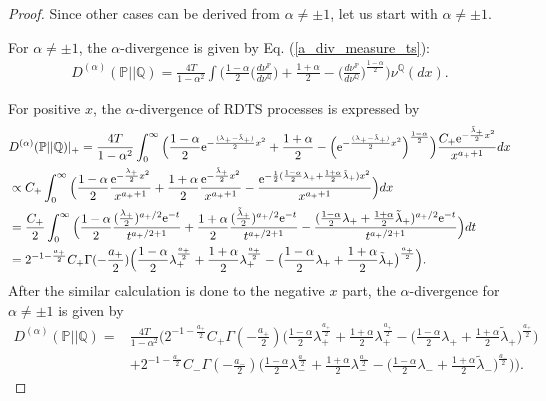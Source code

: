 \documentclass[preprint,11pt]{amsart}
\begin{document}
	\begin{proof}
	Since other cases can be derived from $\alpha \neq \pm 1$, let us start with $\alpha \neq \pm 1$.
	
	For $\alpha \neq \pm 1$, the $\alpha$-divergence is given by Eq. (\ref{a_div_measure_ts}):
	\begin{align}
		D^{(\alpha)}(\mathbb{P}||\mathbb{Q})=\frac{4T}{1-\alpha ^{2}}\int \Big(\frac{1-\alpha}{2}\Big(\frac{d\nu^\mathbb{P}}{d\nu^\mathbb{Q}}\Big) +\frac{1+\alpha}{2}-\Big(\frac{d\nu^\mathbb{P}}{d\nu^\mathbb{Q}}\Big)^{\frac{1-\alpha}{2}}\Big) \nu^\mathbb{Q}(dx).\nonumber
	\end{align}
	
	For positive $x$, the $\alpha$-divergence of RDTS processes is expressed by
	\begin{align}
		&D^{(\alpha)}(\mathbb{P}||\mathbb{Q})|_{+}=\frac{4T}{1-\alpha ^{2}}\int_0^\infty \Big(\frac{1-\alpha}{2}{\rm e}^{-\frac{(\lambda_+-\tilde{\lambda}_+)}{2}x^2} +\frac{1+\alpha}{2}- \Big({\rm e}^{-\frac{(\lambda_+-\tilde{\lambda}_+)}{2}x^2}\Big)^{\frac{1-\alpha}{2}}\Big)\frac{C_+{\rm e}^{-\frac{\tilde{\lambda}_+}{2} x^2}}{x^{a_++1}} dx\nonumber\\
	&\propto C_+\int_0^\infty \Big(\frac{1-\alpha}{2}\frac{{\rm e}^{-\frac{\lambda_+}{2} x^2}}{x^{a_++1}} +\frac{1+\alpha}{2}\frac{{\rm e}^{-\frac{\tilde{\lambda}_+}{2} x^2}}{x^{a_++1}} -\frac{{\rm e}^{-\frac{1}{2}(\frac{1-\alpha}{2}\lambda_++\frac{1+\alpha}{2}\tilde{\lambda}_+) x^2}}{x^{a_++1}} \Big)dx\nonumber\\
	&=\frac{C_+}{2}\int_0^\infty \Big(\frac{1-\alpha}{2}\frac{(\frac{\lambda_+}{2})^{a_+/2}{\rm e}^{-t}}{t^{a_+/2+1}} +\frac{1+\alpha}{2}\frac{(\frac{\tilde{\lambda}_+}{2})^{a_+/2}{\rm e}^{-t}}{t^{a_+/2+1}} -\frac{(\frac{1-\alpha}{2}\lambda_++\frac{1+\alpha}{2}\tilde{\lambda}_+)^{a_+/2}{\rm e}^{-t}}{t^{a_+/2+1}} \Big)dt\nonumber\\
	&=2^{-1-\frac{a_+}{2}}C_+\Gamma(-\frac{a_+}{2})\Big(\frac{1-\alpha}{2}\lambda_+^{\frac{a_+}{2}}+\frac{1+\alpha}{2}\lambda_+^{\frac{a_+}{2}}-\big(\frac{1-\alpha}{2}\lambda_++\frac{1+\alpha}{2}\tilde{\lambda}_+\big)^{\frac{a_+}{2}}\Big).\nonumber
	\end{align}
	After the similar calculation is done to the negative $x$ part, the $\alpha$-divergence for $\alpha \neq \pm 1$ is given by
	\begin{align}
	D^{(\alpha)}(\mathbb{P}||\mathbb{Q})=&\frac{4T}{1-\alpha ^{2}}\bigg(2^{-1-\frac{a_+}{2}}C_+\Gamma(-\frac{a_+}{2})\Big(\frac{1-\alpha}{2}\lambda_+^{\frac{a_+}{2}}+\frac{1+\alpha}{2}\lambda_+^{\frac{a_+}{2}}-\big(\frac{1-\alpha}{2}\lambda_++\frac{1+\alpha}{2}\tilde{\lambda}_+\big)^{\frac{a_+}{2}}\Big)\nonumber\\
	&+2^{-1-\frac{a_-}{2}}C_-\Gamma(-\frac{a_-}{2})\Big(\frac{1-\alpha}{2}\lambda_-^{\frac{a_-}{2}}+\frac{1+\alpha}{2}\lambda_-^{\frac{a_-}{2}}-\big(\frac{1-\alpha}{2}\lambda_-+\frac{1+\alpha}{2}\tilde{\lambda}_-\big)^{\frac{a_-}{2}}\Big)\bigg).\nonumber
	\end{align}
	

\end{proof}
\end{document}
